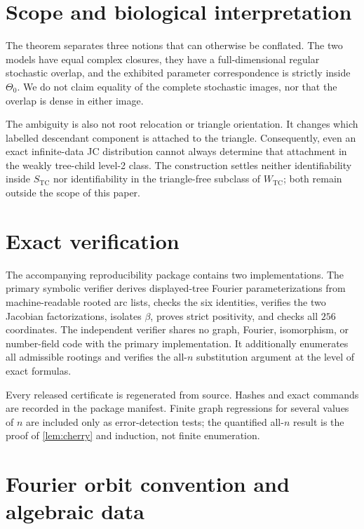 \documentclass[11pt]{article}
\theoremstyle{remark}
\newcommand{\TCw}{W_{\mathrm{TC}}}
\newcommand{\TCs}{S_{\mathrm{TC}}}
\begin{document}
\section{Scope and biological interpretation}

The theorem separates three notions that can otherwise be conflated.  The
two models have equal complex closures, they have a full-dimensional regular
stochastic overlap, and the exhibited parameter correspondence is strictly
inside $\Theta_0$.  We do not claim equality of the complete stochastic
images, nor that the overlap is dense in either image.

The ambiguity is also not root relocation or triangle orientation.  It
changes which labelled descendant component is attached to the triangle.
Consequently, even an exact infinite-data JC distribution cannot always
determine that attachment in the weakly tree-child level-2 class.  The
construction settles neither identifiability inside $\TCs$ nor identifiability
in the triangle-free subclass of $\TCw$; both remain outside the scope of this
paper.

\section{Exact verification}\label{sec:verification}

The accompanying reproducibility package contains two implementations.  The
primary symbolic verifier derives displayed-tree Fourier parameterizations
from machine-readable rooted arc lists, checks the six identities, verifies
the two Jacobian factorizations, isolates $\beta$, proves strict positivity,
and checks all $256$ coordinates.  The independent verifier shares no graph,
Fourier, isomorphism, or number-field code with the primary implementation.
It additionally enumerates all admissible rootings and verifies the all-$n$
substitution argument at the level of exact formulas.

Every released certificate is regenerated from source.  Hashes and exact
commands are recorded in the package manifest.  Finite graph regressions for
several values of $n$ are included only as error-detection tests; the
quantified all-$n$ result is the proof of \cref{lem:cherry} and induction, not
finite enumeration.

\appendix
\section{Fourier orbit convention and algebraic data}\label{app:certificate}
\end{document}
